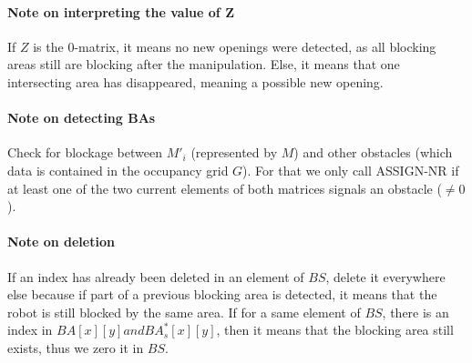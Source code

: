 \paragraph{Note on interpreting the value of Z}\label{interpreting_z_note} If $Z$ is the 0-matrix, it means no new openings were detected, as all blocking areas still are blocking after the manipulation. Else, it means that one intersecting area has disappeared, meaning a possible new opening.

\paragraph{Note on detecting BAs}\label{check_blockage_note} Check for blockage between $M'_{i}$ (represented by $M$) and other obstacles (which data is contained in the occupancy grid $G$). For that we only call ASSIGN-NR if at least one of the two current elements of both matrices signals an obstacle ($\neq 0$).

\paragraph{Note on deletion}\label{deletion_note} If an index has already been deleted in an element of $BS$, delete it everywhere else because if part of a previous blocking area is detected, it means that the robot is still blocked by the same area. If for a same element of $BS$, there is an index in $BA[x][y] and BA^*_{s}[x][y]$, then it means that the blocking area still exists, thus we zero it in $BS$.



\clearpage



